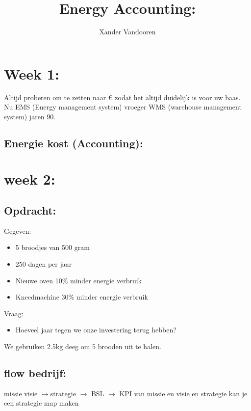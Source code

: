 \documentclass[12pt]{article}
\begin{document}
\begin{titlepage}
    \author{Xander Vandooren}
    \title{Energy Accounting:}
\end{titlepage}
\maketitle
\newpage
\tableofcontents
\newpage
{}
\section{Week 1:}
Altijd proberen om te zetten naar € zodat het altijd duidelijk is voor uw baas.
Nu EMS (Energy management system) vroeger WMS (warehouse management system) jaren 90.
\subsection{Energie kost (Accounting):}
\section{week 2: }
\subsection{Opdracht:}
Gegeven:\begin{itemize}
    \item 5 broodjes van 500 gram 
    \item 250 dagen per jaar
    \item Nieuwe oven 10\% minder energie verbruik 
    \item Kneedmachine 30\% minder energie verbruik 
\end{itemize}
Vraag:\begin{itemize}
    \item Hoeveel jaar tegen we onze investering terug hebben?
\end{itemize}
We gebruiken 2.5kg deeg om 5 brooden uit te halen.
\subsection{flow bedrijf:}
missie visie $\rightarrow$strategie $\rightarrow$ BSL $\rightarrow$ KPI 
van missie en visie en strategie kan je een strategie map maken
\end{document}

